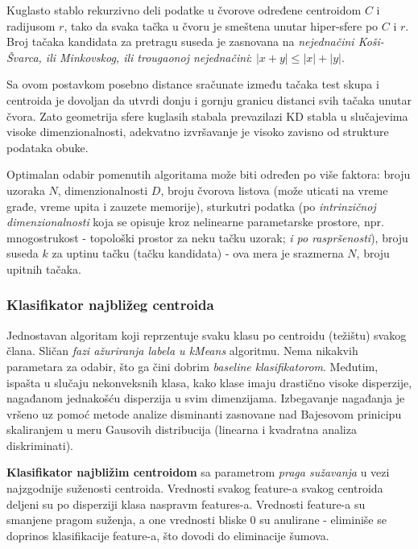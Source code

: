 \documentclass[fontsize=12bp, paper=a4]{scrarticle}
\begin{document}
\begin{itemize}
    Kuglasto stablo rekurzivno deli podatke u čvorove određene centroidom $C$ i radijusom $r$, tako da svaka tačka u čvoru je smeštena unutar hiper-sfere po $C$ i $r$. Broj tačaka kandidata za pretragu suseda je zasnovana na \textit{nejednačini Koši-Švarca, ili Minkovskog, ili trougaonoj nejednačini}\cite{minkowskisphere}: $|x+y| \leq |x| + |y|$.
    
    Sa ovom postavkom posebno distance sračunate između tačaka test skupa i centroida je dovoljan da utvrdi donju i gornju granicu distanci svih tačaka unutar čvora. Zato geometrija sfere kuglasih stabala prevazilazi KD stabla u slučajevima visoke dimenzionalnosti, adekvatno izvršavanje je visoko zavisno od strukture podataka obuke. 
\end{itemize}

Optimalan odabir pomenutih algoritama može biti određen po više faktora: broju uzoraka $N$, dimenzionalnosti $D$, broju čvorova listova (može uticati na vreme građe, vreme upita i zauzete memorije), sturkutri podatka (po \textit{intrinzičnoj dimenzionalnosti} koja se opisuje kroz nelinearne parametarske prostore, npr. mnogostrukost - topološki prostor za neku tačku uzorak; \textit{i po raspršenosti}), broju suseda $k$ za uptinu tačku (tačku kandidata) - ova mera je srazmerna $N$, broju upitnih tačaka.


\subsubsection{Klasifikator najbližeg centroida}

Jednostavan algoritam koji reprzentuje svaku klasu po centroidu (težištu) svakog člana. Sličan \textit{fazi ažuriranja labela u kMeans} algoritmu. Nema nikakvih parametara za odabir, što ga čini dobrim \textit{baseline klasifikatorom}. Međutim, ispašta u slučaju nekonveksnih klasa, kako klase imaju drastično visoke disperzije, nagađanom jednakošću disperzija u svim dimenzijama. Izbegavanje nagađanja je vršeno uz pomoć metode analize disminanti zasnovane nad Bajesovom prinicipu skaliranjem u meru Gausovih distribucija (linearna i kvadratna analiza diskriminati)\cite{lda-qda}.

\vbox{}

\textbf{Klasifikator najbližim centroidom} sa parametrom \textit{praga sužavanja} u vezi najzgodnije suženosti centroida. Vrednosti svakog feature-a svakog centroida deljeni su po disperziji klasa naspravm features-a. Vrednosti feature-a su smanjene pragom suženja, a one vrednosti bliske 0 su anulirane - eliminiše se doprinos klasifikacije feature-a, što dovodi do eliminacije šumova. 
\end{document}
